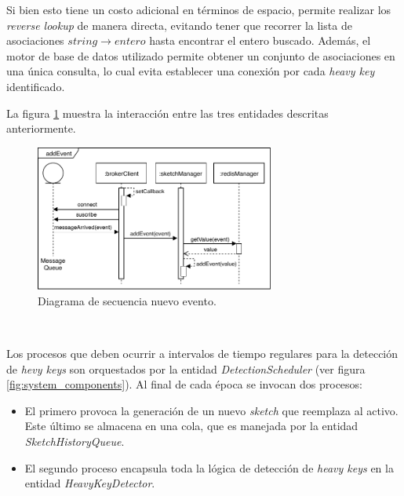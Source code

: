 \documentclass[a4paper,10pt, oneside]{article}
\begin{document}
Si bien esto tiene un costo adicional en términos de espacio, permite realizar los \textit{reverse lookup} de manera directa, evitando tener que recorrer la lista de asociaciones $string \rightarrow entero$ hasta encontrar el entero buscado. Además, el motor de base de datos utilizado permite obtener un conjunto de asociaciones en una única consulta, lo cual evita establecer una conexión por cada \textit{heavy key} identificado.

La figura \ref{diag:add_event} muestra la interacción entre las tres entidades descritas anteriormente.

\begin{figure}[h]
	\centering
	\includegraphics[width=0.7\textwidth]{./graph/SecDiag-resourceAddEventMosquitto.pdf}
	\caption{Diagrama de secuencia nuevo evento.}
	\label{diag:add_event}
\end{figure}

\

Los procesos que deben ocurrir a intervalos de tiempo regulares para la detección de \textit{hevy keys} son orquestados por la entidad \textit{DetectionScheduler} (ver figura \ref{fig:system_components}). Al final de cada época se invocan dos procesos: 
\begin{itemize}
	\item El primero provoca la generación de un nuevo \textit{sketch} que reemplaza al activo. Este último se almacena en una cola, que es manejada por la entidad \textit{SketchHistoryQueue}.
	\item El segundo proceso encapsula toda la lógica de detección de \textit{heavy keys} en la entidad \textit{HeavyKeyDetector}.
\end{itemize}
\end{document}
